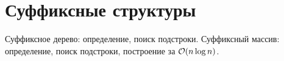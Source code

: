 \section{Суффиксные структуры}
Суффиксное дерево: определение, поиск подстроки.
Суффиксный массив: определение, поиск подстроки,
построение за $\mathcal{O}(n \log n)$.
